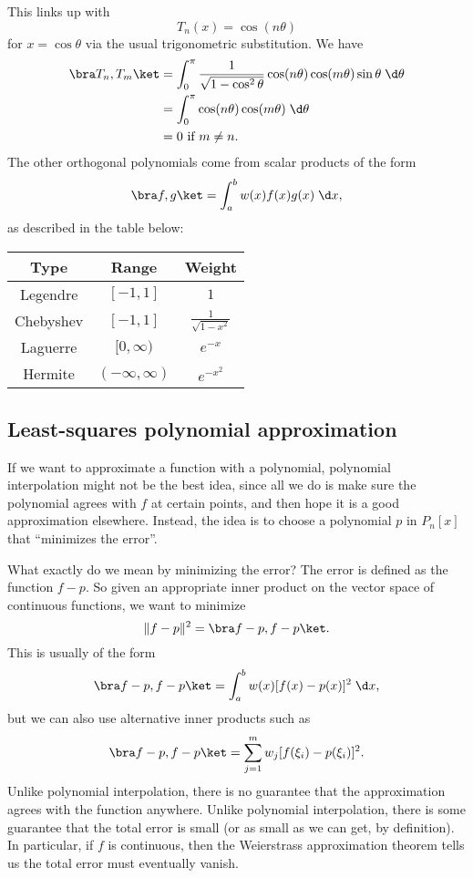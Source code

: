 \documentclass[a4paper]{article}
\begin{document}
This links up with
\[
  T_n (x) = \cos(n\theta)
\]
for $x = \cos \theta$ via the usual trigonometric substitution. We have
\begin{align*}
  \bra T_n, T_m \ket &= \int_0^\pi \frac{1}{\sqrt{1 - \cos^2 \theta}} \cos(n\theta) \cos (m\theta) \sin \theta \;\d \theta\\
  &= \int_0^\pi \cos(n\theta) \cos (m\theta)\;\d \theta\\
  &= 0\text{ if }m\not= n.
\end{align*}
The other orthogonal polynomials come from scalar products of the form
\[
  \bra f, g\ket = \int_a^b w(x) f(x) g(x)\;\d x,
\]
as described in the table below:
\begin{center}
  \begin{tabular}{ccc}
    \toprule
    Type & Range & Weight\\
    \midrule
    Legendre & $[-1, 1]$ & $1$\\
    Chebyshev & $[-1, 1]$ & $\frac{1}{\sqrt{1 - x^2}}$\\
    Laguerre & $[0, \infty)$ & $e^{-x}$\\
    Hermite & $(-\infty, \infty)$ & $e^{-x^2}$\\
    \bottomrule
  \end{tabular}
\end{center}
\subsection{Least-squares polynomial approximation}
If we want to approximate a function with a polynomial, polynomial interpolation might not be the best idea, since all we do is make sure the polynomial agrees with $f$ at certain points, and then hope it is a good approximation elsewhere. Instead, the idea is to choose a polynomial $p$ in $P_n[x]$ that ``minimizes the error''.

What exactly do we mean by minimizing the error? The error is defined as the function $f - p$. So given an appropriate inner product on the vector space of continuous functions, we want to minimize
\[
  \|f - p\|^2 = \bra f - p, f - p\ket.
\]
This is usually of the form
\[
  \bra f - p, f - p\ket = \int_a^b w(x) [f(x) - p(x)]^2 \;\d x,
\]
but we can also use alternative inner products such as
\[
  \bra f - p, f - p\ket = \sum_{j = 1}^m w_j [f(\xi_i) - p(\xi_i)]^2.
\]
Unlike polynomial interpolation, there is no guarantee that the approximation agrees with the function anywhere. Unlike polynomial interpolation, there is some guarantee that the total error is small (or as small as we can get, by definition). In particular, if $f$ is continuous, then the Weierstrass approximation theorem tells us the total error must eventually vanish.
\end{document}

